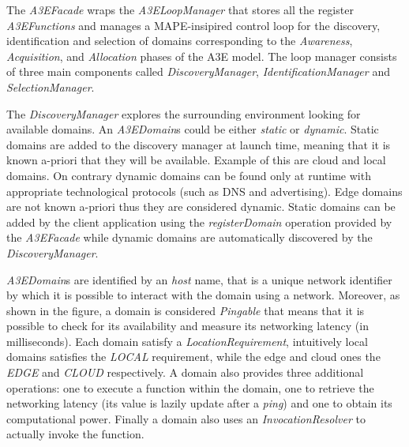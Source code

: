 The \textit{A3EFacade} wraps the \textit{A3ELoopManager} that stores all the register \textit{A3EFunctions} and manages a MAPE-insipired control loop for the discovery, identification and selection of domains corresponding to the \textit{Awareness}, \textit{Acquisition}, and \textit{Allocation} phases of the A3E model. The loop manager  consists of three main components called \textit{DiscoveryManager}, \textit{IdentificationManager} and \textit{SelectionManager}. 

The \textit{DiscoveryManager} explores the surrounding environment looking for available domains. An  \textit{A3EDomain}s could be either \textit{static} or \textit{dynamic}. Static domains are added to the discovery manager at launch time, meaning that it is known a-priori that they will be available. Example of this are cloud and local domains. On contrary dynamic domains can be found only at runtime with appropriate technological protocols (such as DNS and advertising). Edge domains are not known a-priori thus they are considered dynamic. Static domains can be added by the client application using the \textit{registerDomain} operation provided by the \textit{A3EFacade} while dynamic domains are automatically discovered by the \textit{DiscoveryManager}.

 \textit{A3EDomain}s  are identified by an \textit{host} name, that is a unique network identifier by which it is possible to interact with the domain using a network. Moreover, as shown in the figure, a domain is considered \textit{Pingable} that means that it is possible to check for its availability and measure its networking latency (in milliseconds). Each domain satisfy a \textit{LocationRequirement}, intuitively local domains satisfies the \textit{LOCAL} requirement, while the edge and cloud ones the \textit{EDGE} and \textit{CLOUD} respectively.  A domain also provides three additional operations: one to execute a function within the domain, one to retrieve the networking latency (its value is lazily update after a \textit{ping}) and one to obtain its computational power. Finally a domain also uses an \textit{InvocationResolver} to actually invoke the function. 
 
